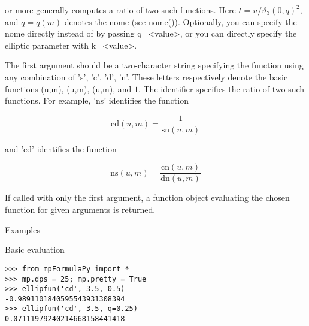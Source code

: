 or more generally computes a ratio of two such functions. Here $t=u/\vartheta_3(0,q)^2$, and $q=q(m)$ denotes the nome (see nome()). Optionally, you can specify the nome
directly instead of by passing q=<value>, or you can directly specify the elliptic parameter with k=<value>.

The first argument should be a two-character string specifying the function using any combination of 's', 'c', 'd', 'n'. These letters respectively denote the basic functions (u,m), (u,m), (u,m), and $1$. The identifier specifies the ratio of two such functions. For example, 'ns' identifies the function 

\begin{equation}
\text{cd}(u,m) = \frac{1}{\text{sn}(u,m)}
\end{equation}

and 'cd' identifies the function 

\begin{equation}
\text{ns}(u,m) = \frac{\text{cn}(u,m)}{\text{dn}(u,m)}
\end{equation}


If called with only the first argument, a function object evaluating the chosen function for given arguments is returned.

Examples

Basic evaluation

\begin{lstlisting}
>>> from mpFormulaPy import *
>>> mp.dps = 25; mp.pretty = True
>>> ellipfun('cd', 3.5, 0.5)
-0.9891101840595543931308394
>>> ellipfun('cd', 3.5, q=0.25)
0.07111979240214668158441418
\end{lstlisting}


